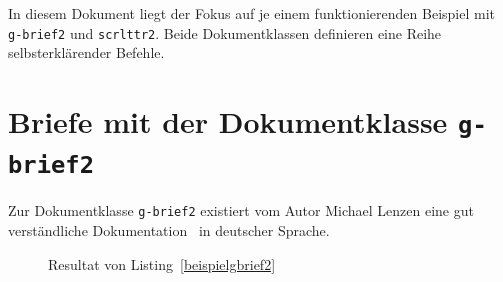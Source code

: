 \documentclass[a4paper,10pt,twoside]{scrbook}
\begin{document}
In diesem Dokument liegt der Fokus auf je einem funktionierenden Beispiel mit \verb!g-brief2! und \verb!scrlttr2!. Beide Dokumentklassen definieren eine Reihe selbsterklärender Befehle. 

\section{Briefe mit der Dokumentklasse \texttt{g-brief2}}

Zur Dokumentklasse \verb!g-brief2! existiert vom Autor Michael Lenzen eine gut verständliche Dokumentation~\cite{gbrief_Dokumentation} in deutscher Sprache.  




\begin{figure}[H]
    \caption{Resultat von Listing~\ref{beispielgbrief2}}
    \label{fig_gbrief2}
\end{figure}
\end{document}
